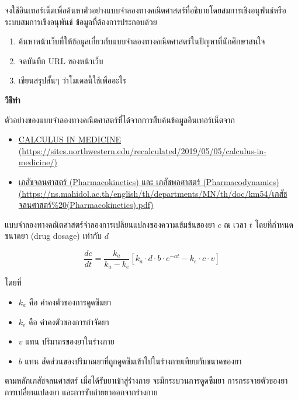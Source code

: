 \documentclass[
]{book}
\begin{document}
\label{exm4}
จงใช้อินเทอร์เน็ตเพื่อค้นหาตัวอย่างแบบจำลองทางคณิตศาสตร์ที่อธิบายโดยสมการเชิงอนุพันธ์หรือระบบสมการเชิงอนุพันธ์
ข้อมูลที่ต้องการประกอบด้วย

\begin{enumerate}
\def\labelenumi{\arabic{enumi}.}
\item
  ค้นหาหน้าเว็บที่ให้ข้อมูลเกี่ยวกับแบบจำลองทางคณิตศาสตร์ในปัญหาที่นักศึกษาสนใจ
\item
  จดบันทึก URL ของหน้าเว็บ
\item
  เขียนสรุปสั้นๆ ว่าโมเดลนี้ใช้เพื่ออะไร
\end{enumerate}

\textbf{วิธีทำ}

ตัวอย่างของแบบจำลองทางคณิตศาสตร์ที่ได้จากการสืบค้นข้อมูลอินเทอร์เน็ตจาก

\begin{itemize}
\item
  \href{https://sites.northwestern.edu/recalculated/2019/05/05/calculus-in-medicine/}{CALCULUS
  IN MEDICINE
  (https://sites.northwestern.edu/recalculated/2019/05/05/calculus-in-medicine/)}
\item
  \href{https://ns.mahidol.ac.th/english/th/departments/MN/th/doc/km54/เภสัชจลนศาสตร์\%20(Pharmacokinetics).pdf}{เภสัชจลนศาสตร์
  (Pharmacokinetics) และ เภสัชพลศาสตร์ (Pharmacodynamics)
  (https://ns.mahidol.ac.th/english/th/departments/MN/th/doc/km54/เภสัชจลนศาสตร์\%20(Pharmacokinetics).pdf)}
\end{itemize}

แบบจำลองทางคณิตศาสตร์จำลองการเปลี่ยนแปลงของความเข้มข้นของยา \(c\) ณ เวลา \(t\)
โดยที่กำหนดขนาดยา (drug dosage) เท่ากับ \(d\)

\[
\frac{dc}{dt} = \frac{k_a}{k_a - k_e}\left[ k_a \cdot d \cdot b \cdot e^{-at} - k_e \cdot c \cdot v \right]
\]

โดยที่

\begin{itemize}
\item
  \(k_a\) คือ ค่าคงตัวของการดูดซึมยา
\item
  \(k_e\) คือ ค่าคงตัวของการกำจัดยา
\item
  \(v\) แทน ปริมาตรของยาในร่างกาย
\item
  \(b\) แทน สัดส่วนของปริมาณยาที่ถูกดูดซึมเข้าไปในร่างกายเทียบกับขนาดของยา
\end{itemize}

ตามหลักเภสัชจลนศาสตร์ เมื่อได้รับยาเข้าสู่ร่างกาย จะมีกระบวนการดูดซึมยา
การกระจายตัวของยา การเปลี่ยนแปลงยา และการขับถ่ายยาออกจากร่างกาย
\end{document}
